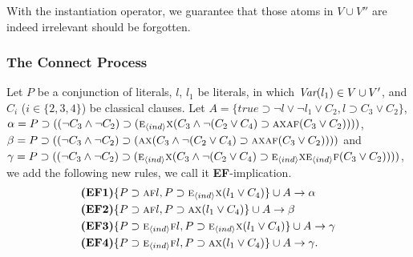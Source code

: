 \documentclass{article}
\begin{document}
With the instantiation operator, we guarantee that those atoms in $V\cup V''$ are indeed irrelevant \ie should be forgotten.


\subsubsection{The Connect Process}
Let $P$ be a conjunction of literals, $l$, $l_1$ be literals,
in which $\textit{Var}(l_1)\in V \cup V'$,
and $C_i$ ($i\in \{2,3,4\}$) be classical clauses.
Let $A=\{true \supset \neg l \vee \neg l_1 \vee C_2, l \supset C_3\vee C_2\}$, $\alpha=P \supset ((\neg C_3 \wedge \neg C_2) \supset  (\textsc{e}_{{\langle{ind}\rangle}}\textsc{x}(C_3 \wedge \neg (C_2 \vee C_4) \supset \textsc{a}\textsc{x} \textsc{a}\textsc{f}(C_3 \vee C_2))))$, $\beta = P \supset ((\neg C_3 \wedge \neg C_2) \supset (\textsc{a}\textsc{x}(C_3 \wedge  \neg (C_2 \vee C_4) \supset \textsc{a}\textsc{x} \textsc{a}\textsc{f}(C_3 \vee C_2))))$ and $\gamma = P \supset ((\neg C_3 \wedge \neg C_2) \supset (\textsc{e}_{{\langle{ind}\rangle}}\textsc{x}(C_3 \wedge  \neg (C_2 \vee C_4) \supset \textsc{e}_{{\langle{ind}\rangle}}\textsc{x} \textsc{e}_{{\langle{ind}\rangle}}\textsc{f}(C_3 \vee C_2))))$, we add the following new rules, we call it \textbf{EF}-implication.
\begin{align*}
& \textbf{(EF1)} \{P\supset \textsc{a}\textsc{f} l, P\supset \textsc{e}_{{\langle{ind}\rangle}}\textsc{x} (l_1 \vee C_4)\}\cup A \rightarrow \alpha \\
& \textbf{(EF2)} \{P\supset \textsc{a}\textsc{f} l, P\supset \textsc{a} \textsc{x} (l_1 \vee C_4)\}\cup A \rightarrow \beta \\
& \textbf{(EF3)} \{P\supset \textsc{e}_{{\langle{ind}\rangle}}\textsc{f} l, P\supset \textsc{e}_{{\langle{ind}\rangle}}\textsc{x} (l_1 \vee C_4)\}\cup A \rightarrow \gamma  \\
& \textbf{(EF4)} \{P\supset \textsc{e}_{{\langle{ind}\rangle}}\textsc{f} l, P\supset \textsc{a}\textsc{x} (l_1 \vee C_4)\}\cup A \rightarrow \gamma.
\end{align*}
\end{document}
